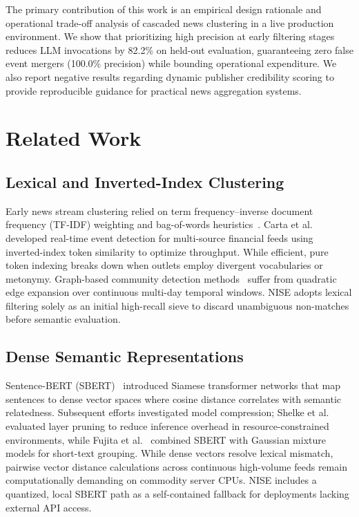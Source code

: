\documentclass[conference]{IEEEtran}
\begin{document}
The primary contribution of this work is an empirical design rationale and operational trade-off analysis of cascaded news clustering in a live production environment.
We show that prioritizing high precision at early filtering stages reduces LLM invocations by 82.2\% on held-out evaluation, guaranteeing zero false event mergers (100.0\% precision) while bounding operational expenditure.
We also report negative results regarding dynamic publisher credibility scoring to provide reproducible guidance for practical news aggregation systems.

\section{Related Work}

\subsection{Lexical and Inverted-Index Clustering}
Early news stream clustering relied on term frequency--inverse document frequency (TF-IDF) weighting and bag-of-words heuristics~\cite{salton1988}.
Carta et al.~\cite{carta2022} developed real-time event detection for multi-source financial feeds using inverted-index token similarity to optimize throughput.
While efficient, pure token indexing breaks down when outlets employ divergent vocabularies or metonymy.
Graph-based community detection methods~\cite{aggarwal2012} suffer from quadratic edge expansion over continuous multi-day temporal windows.
NISE adopts lexical filtering solely as an initial high-recall sieve to discard unambiguous non-matches before semantic evaluation.

\subsection{Dense Semantic Representations}
Sentence-BERT (SBERT)~\cite{reimers2019sentence} introduced Siamese transformer networks that map sentences to dense vector spaces where cosine distance correlates with semantic relatedness.
Subsequent efforts investigated model compression; Shelke et al.~\cite{shelke2022} evaluated layer pruning to reduce inference overhead in resource-constrained environments, while Fujita et al.~\cite{fujita2023} combined SBERT with Gaussian mixture models for short-text grouping.
While dense vectors resolve lexical mismatch, pairwise vector distance calculations across continuous high-volume feeds remain computationally demanding on commodity server CPUs.
NISE includes a quantized, local SBERT path as a self-contained fallback for deployments lacking external API access.
\end{document}
